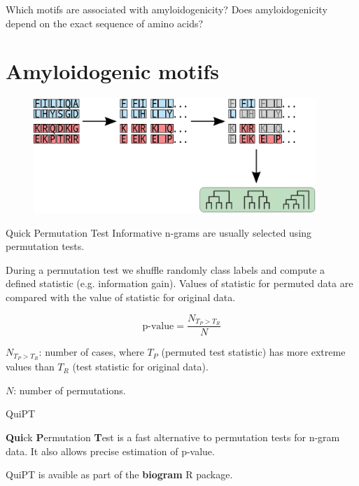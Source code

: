 \documentclass{beamer}\usepackage[]{graphicx}\usepackage[]{color}
\begin{document}
  \begin{frame}
  Which motifs are associated with amyloidogenicity?
  Does amyloidogenicity depend on the exact sequence of amino acids?
  \end{frame}

\section{Amyloidogenic motifs}

    \begin{frame}
\begin{figure} 
\includegraphics[width=0.95\textwidth]{static_figure/ngram1.eps}
\end{figure}
  \end{frame}
  

\begin{frame}{Quick Permutation Test}
  Informative n-grams are usually selected using permutation tests.

During a permutation test we shuffle randomly class labels and compute a defined statistic (e.g. information gain). Values of statistic for permuted data are compared with the value of statistic for original data.

$$
\textrm{p-value} = \frac{N_{T_P > T_R}}{N} $$

$N_{T_P > T_R}$: number of cases, where $T_P$ (permuted test statistic) has more extreme values than $T_R$ (test statistic for original data).

$N$: number of permutations.
  \end{frame}
  
\begin{frame}{QuiPT}  
  
  \textbf{Qui}ck \textbf{P}ermutation \textbf{T}est is a fast alternative to permutation tests for n-gram data. It also allows precise estimation of p-value.

QuiPT is avaible as part of the \textbf{biogram} R package.
\end{frame}
  
\end{document}
